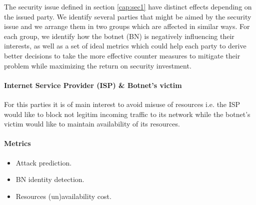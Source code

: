 The security issue defined in section \ref{cap:sec1} have distinct effects depending on the issued party. We identify several parties that might be aimed by the security issue and we arrange them in two groups which are affected in similar ways. For each group, we identify how the botnet (BN) is negatively influencing their interests, as well as a set of ideal metrics which could help each party to derive better decisions to take the more effective counter measures to mitigate their problem while maximizing the return on security investment.

\indent
\paragraph{Internet Service Provider (ISP) \& Botnet's victim}
For this parties it is of main interest to avoid misuse of resources i.e. the ISP would like to block not legitim incoming traffic to its network while the botnet's victim would like to maintain availability of its resources.
\paragraph{Metrics}
\begin{itemize}
    \item Attack prediction.
    \item BN identity detection.
    \item Resources (un)availability cost.
\end{itemize}
\indent
\indent
